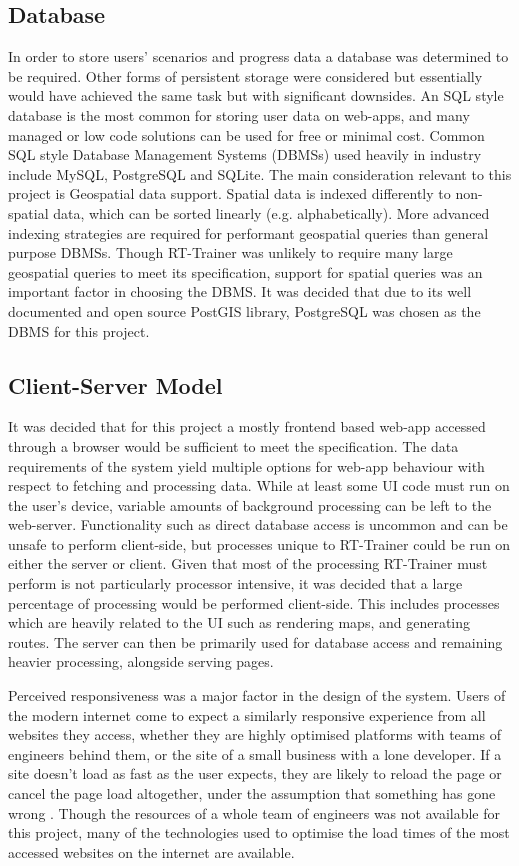 \subsection{Database}
In order to store users' scenarios and progress data a database was determined to be required. Other forms of persistent storage were considered but essentially would have achieved the same task but with significant downsides. An SQL style database is the most common for storing user data on web-apps, and many managed or low code solutions can be used for free or minimal cost. Common SQL style Database Management Systems (DBMSs) used heavily in industry include MySQL, PostgreSQL and SQLite. The main consideration relevant to this project is Geospatial data support. Spatial data is indexed differently to non-spatial data, which can be sorted linearly (e.g. alphabetically). More advanced indexing strategies are required for performant geospatial queries than general purpose DBMSs. Though RT-Trainer was unlikely to require many large geospatial queries to meet its specification, support for spatial queries was an important factor in choosing the DBMS. It was decided that due to its well documented and open source PostGIS library, PostgreSQL was chosen as the DBMS for this project.

\subsection{Client-Server Model}
It was decided that for this project a mostly frontend based web-app accessed through a browser would be sufficient to meet the specification. The data requirements of the system yield multiple options for web-app behaviour with respect to fetching and processing data. While at least some UI code must run on the user's device, variable amounts of background processing can be left to the web-server. Functionality such as direct database access is uncommon and can be unsafe to perform client-side, but processes unique to RT-Trainer could be run on either the server or client. Given that most of the processing RT-Trainer must perform is not particularly processor intensive, it was decided that a large percentage of processing would be performed client-side. This includes processes which are heavily related to the UI such as rendering maps, and generating routes. The server can then be primarily used for database access and remaining heavier processing, alongside serving pages.

Perceived responsiveness was a major factor in the design of the system. Users of the modern internet come to expect a similarly responsive experience from all websites they access, whether they are highly optimised platforms with teams of engineers behind them, or the site of a small business with a lone developer. If a site doesn't load as fast as the user expects, they are likely to reload the page or cancel the page load altogether, under the assumption that something has gone wrong \cite{}. Though the resources of a whole team of engineers was not available for this project, many of the technologies used to optimise the load times of the most accessed websites on the internet are available.

